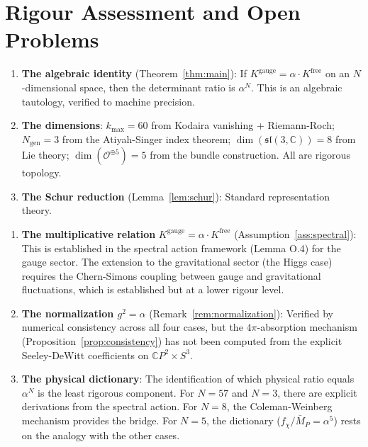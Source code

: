 \documentclass[11pt]{article}
\theoremstyle{definition}
\theoremstyle{remark}
\newcommand{\CP}{\mathbb{C}P}
\newcommand{\Mpr}{\bar{M}_P}
\begin{document}
\section{Rigour Assessment and Open Problems}
\label{sec:rigour}

\begin{tcolorbox}[colback=green!5!white, colframe=green!50!black,
  title=\textbf{What Is Proved}]
\begin{enumerate}
\item[\textbf{A+}] \textbf{The algebraic identity}
(Theorem~\ref{thm:main}): If $K^{\mathrm{gauge}} = \alpha \cdot
K^{\mathrm{free}}$ on an $N$-dimensional space, then the determinant
ratio is $\alpha^N$. This is an algebraic tautology, verified to
machine precision.

\item[\textbf{A}] \textbf{The dimensions}: $k_{\max} = 60$ from
Kodaira vanishing + Riemann-Roch; $N_{\mathrm{gen}} = 3$ from the
Atiyah-Singer index theorem; $\dim(\mathfrak{sl}(3,\mathbb{C})) = 8$
from Lie theory; $\dim(\mathcal{O}^{\oplus 5}) = 5$ from the bundle
construction. All are rigorous topology.

\item[\textbf{A}] \textbf{The Schur reduction} (Lemma~\ref{lem:schur}):
Standard representation theory.
\end{enumerate}
\end{tcolorbox}

\begin{tcolorbox}[colback=yellow!5!white, colframe=yellow!60!black,
  title=\textbf{What Requires Assumption}]
\begin{enumerate}
\item[\textbf{B+}] \textbf{The multiplicative relation}
$K^{\mathrm{gauge}} = \alpha \cdot K^{\mathrm{free}}$
(Assumption~\ref{ass:spectral}): This is established in the spectral
action framework (Lemma O.4) for the gauge sector. The extension to
the gravitational sector (the Higgs case) requires the Chern-Simons
coupling between gauge and gravitational fluctuations, which is
established but at a lower rigour level.

\item[\textbf{B}] \textbf{The normalization $g^2 = \alpha$}
(Remark~\ref{rem:normalization}): Verified by numerical consistency
across all four cases, but the $4\pi$-absorption mechanism
(Proposition~\ref{prop:consistency}) has not been computed from the
explicit Seeley-DeWitt coefficients on $\CP^2 \times S^3$.

\item[\textbf{B$-$}] \textbf{The physical dictionary}: The
identification of which physical ratio equals $\alpha^N$ is the least
rigorous component. For $N = 57$ and $N = 3$, there are explicit
derivations from the spectral action. For $N = 8$, the
Coleman-Weinberg mechanism provides the bridge. For $N = 5$, the
dictionary ($f_\chi / \Mpr = \alpha^5$) rests on the analogy with the
other cases.
\end{enumerate}
\end{tcolorbox}
\end{document}
